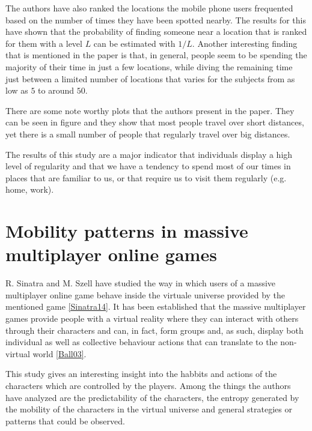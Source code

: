 The authors have also ranked the locations the mobile phone users frequented
based on the number of times they have been spotted nearby. The results for this
have shown that the probability of finding someone near a location that is
ranked for them with a level $L$ can be estimated with $1/L$. Another
interesting finding that is mentioned in the paper is that, in general, people
seem to be spending the majority of their time in just a few locations, while
diving the remaining time just between a limited number of locations that varies
for the subjects from as low as $5$ to around $50$.

There are some note worthy plots that the authors present in the paper. They can
be seen in figure{} and they show that most people travel over short distances,
yet there is a small number of people that regularly travel over big distances.

The results of this study are a major indicator that individuals display a high
level of regularity and that we have a tendency to spend most of our times in
places that are familiar to us, or that require us to visit them regularly
(e.g. home, work).

\section{Mobility patterns in massive multiplayer online games}
R. Sinatra and M. Szell have studied the way in which users of a massive
multiplayer online game behave inside the virtuale universe provided by the
mentioned game \ref{Sinatra14}. It has been established that the massive
multiplayer games provide people with a virtual reality where they can interact
with others through their characters and can, in fact, form groups and, as
such, display both individual as well as collective behaviour actions that can
translate to the non-virtual world \ref{Ball03}.

This study gives an interesting insight into the habbits and actions of the
characters which are controlled by the players. Among the things the authors
have analyzed are the predictability of the characters, the entropy generated
by the mobility of the characters in the virtual universe and general
strategies or patterns that could be observed.

